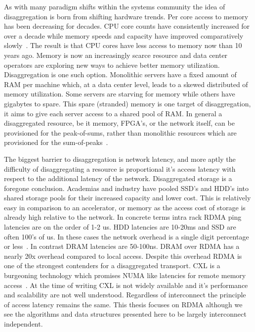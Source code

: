 \documentclass[12pt]{ucsddissertation}
\begin{document}
As with many paradigm shifts within the systems community the idea of disaggregation is born from
shifting hardware trends. Per core access to memory has been decreasing for decades. CPU core counts
have consistently increased for over a decade while memory speeds and capacity have improved
comparatively slowly~\cite{micron-memorywall}. The result is that CPU cores have less access to
memory now than 10 years ago. Memory is now an increasingly scarce resource and data center
operators are exploring new ways to achieve better memory utilization. Disaggregation is one such
option. Monolithic servers have a fixed amount of RAM per machine which, at a data center level,
leads to a skewed distributed of memory utilization. Some servers are starving for memory while
others have gigabytes to spare. This spare (stranded) memory is one target of disaggregation, it
aims to give each server access to a shared pool of RAM. In general a disaggregated resource, be it
memory, FPGA's, or the network itself, can be provisioned for the peak-of-sums, rather than
monolithic resources which are provisioned for the sum-of-peaks~\cite{clio,supernic,dsnf}.

The biggest barrier to disaggregation is network latency, and more aptly the difficulty of
disaggregating a resource is proportional it's access latency with respect to the additional latency
of the network. Disaggregated storage is a foregone conclusion. Academias and industry have pooled
SSD's and HDD's into shared storage pools for their increased capacity and lower cost. This is
relatively easy in comparison to an accelerator, or memory as the access cost of storage is already
high relative to the network. In concrete terms intra rack RDMA ping latencies are on the order of
1-2 us. HDD latencies are 10-20ms and SSD are often 100's of us. In these cases the network overhead
is a single digit percentage or less~\cite{decible}. In
contrast DRAM latencies are 50-100ns. DRAM over RDMA has a nearly 20x overhead compared to local
access. Despite this overhead RDMA is one of the strongest contenders for a disaggregated transport.
CXL is a burgeoning technology which promises NUMA like latencies for remote memory
access~\cite{cxl}. At the time of writing CXL is not widely available and it's performance and
scalability are not well understood. Regardless of interconnect the principle of access latency
remains the same. This thesis focuses on RDMA although we see the algorithms and data structures
presented here to be largely interconnect independent.
\end{document}

